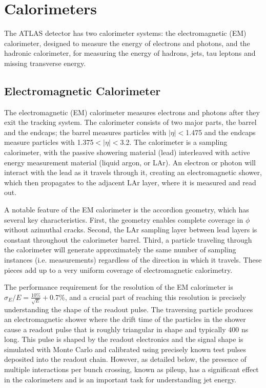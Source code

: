 \section{Calorimeters}
The ATLAS detector has two calorimeter systems: the electromagnetic (EM) calorimeter, designed to measure the energy of electrons and photons, and the hadronic calorimeter, for measuring the energy of hadrons, jets, tau leptons and missing transverse energy.  

\subsection{Electromagnetic Calorimeter}
The electromagnetic (EM) calorimeter measures electrons and photons after they exit the tracking system.  The calorimeter consists of two major parts, the barrel and the endcaps; the barrel measures particles with $|\eta|<$1.475 and the endcaps measure particles with 1.375$<|\eta|<$3.2.  The calorimeter is a sampling calorimeter, with the passive showering material (lead) interleaved with active energy measurement material (liquid argon, or LAr).  An electron or photon will interact with the lead as it travels through it, creating an electromagnetic shower, which then propagates to the adjacent LAr layer, where it is measured and read out.

A notable feature of the EM calorimeter is the accordion geometry, which has several key characteristics.  First, the geometry enables complete coverage in $\phi$ without azimuthal cracks.  Second, the LAr sampling layer between lead layers is constant throughout the calorimeter barrel.  Third, a particle traveling through the calorimeter will generate approximately the same number of sampling instances (i.e. measurements) regardless of the direction in which it travels.  These pieces add up to a very uniform coverage of electromagnetic calorimetry.

The performance requirement for the resolution of the EM calorimeter is $\sigma_E/E=\frac{10\%}{\sqrt{E}}+$0.7\%, and a crucial part of reaching this resolution is precisely understanding the shape of the readout pulse.  The traversing particle produces an electromagnetic shower where the drift time of the particles in the shower cause a readout pulse that is roughly triangular in shape and typically 400 ns long.  This pulse is shaped by the readout electronics and the signal shape is simulated with Monte Carlo and calibrated using precisely known test pulses deposited into the readout chain.  However, as detailed below, the presence of multiple interactions per bunch crossing, known as pileup, has a significant effect in the calorimeters and is an important task for understanding jet energy.

